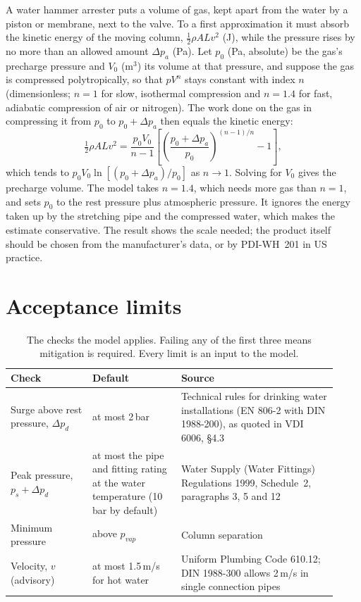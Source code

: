 \documentclass[a4paper,justified,nobib]{tufte-handout}
\newcommand{\sidecite}[2][]{\sidenote{\citet{#2}\ifx&#1&\else, #1\fi.}}
\begin{document}
A water hammer arrester puts a volume of gas, kept apart from the water by a
piston or membrane, next to the valve. To a first approximation it must absorb
the kinetic energy of the moving column, $\tfrac12\rho A L v^2$ (J), while the
pressure rises by no more than an allowed amount $\Delta p_a$ (Pa). Let $p_0$
(Pa, absolute) be the gas's precharge pressure and $V_0$ (m$^3$) its volume at
that pressure, and suppose the gas is compressed polytropically, so that
$p V^n$ stays constant with index $n$ (dimensionless; $n=1$ for slow,
isothermal compression and $n=1.4$ for fast, adiabatic compression of air or
nitrogen). The work done on the gas in compressing it from $p_0$ to
$p_0+\Delta p_a$ then equals the kinetic energy:
\begin{equation}
  \tfrac12 \rho A L v^2 = \frac{p_0 V_0}{n-1}\left[\left(\frac{p_0+\Delta p_a}{p_0}\right)^{(n-1)/n} - 1\right],
  \label{eq:arrester}
\end{equation}
which tends to $p_0V_0\ln\!\left[(p_0+\Delta p_a)/p_0\right]$ as $n\to1$.
Solving for $V_0$ gives the precharge volume. The model takes $n=1.4$, which
needs more gas than $n=1$, and sets $p_0$ to the rest pressure plus
atmospheric pressure. It ignores the energy taken up by the stretching pipe and
the compressed water, which makes the estimate conservative. The result shows
the scale needed; the product itself should be chosen from the manufacturer's
data, or by PDI-WH~201 in US practice.\sidecite{pdiwh201}

\section{Acceptance limits}
\label{sec:limits}

\begin{table}
  \small
  \begin{tabular}{@{}p{0.23\linewidth}p{0.25\linewidth}p{0.44\linewidth}@{}}
    \toprule
    Check & Default & Source \\
    \midrule
    Surge above rest pressure, $\Delta p_d$ & at most 2\,bar & Technical rules for drinking water installations (EN 806-2 with DIN 1988-200), as quoted in VDI 6006, \S4.3 \\
    Peak pressure, $p_s+\Delta p_d$ & at most the pipe and fitting rating at the water temperature (10\,bar by default) & Water Supply (Water Fittings) Regulations 1999, Schedule~2, paragraphs 3, 5 and 12 \\
    Minimum pressure & above $p_{vap}$ & Column separation \\
    Velocity, $v$ (advisory) & at most 1.5\,m/s for hot water & Uniform Plumbing Code 610.12; DIN 1988-300 allows 2\,m/s in single connection pipes \\
    \bottomrule
  \end{tabular}
  \caption{The checks the model applies. Failing any of the first three means
  mitigation is required. Every limit is an input to the model.}
  \label{tab:limits}
\end{table}
\end{document}
